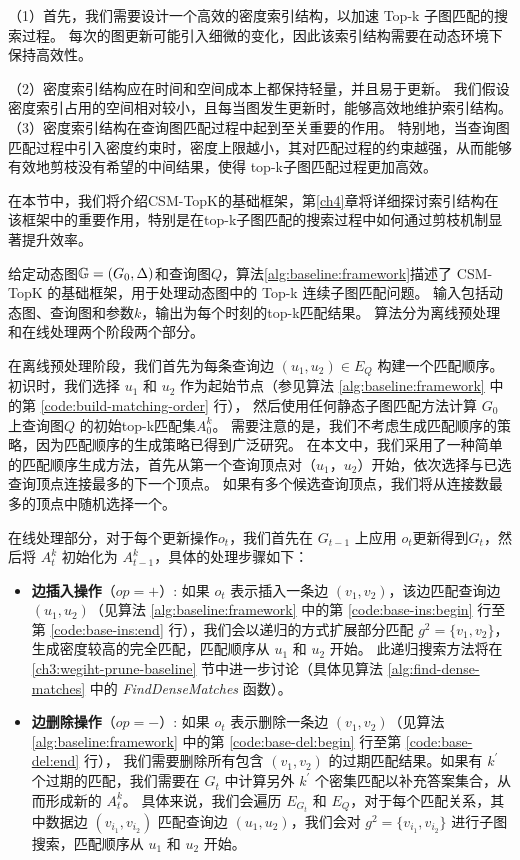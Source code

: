 （1）首先，我们需要设计一个高效的密度索引结构，以加速 Top-k 子图匹配的搜索过程。
每次的图更新可能引入细微的变化，因此该索引结构需要在动态环境下保持高效性。

（2）密度索引结构应在时间和空间成本上都保持轻量，并且易于更新。
我们假设密度索引占用的空间相对较小，且每当图发生更新时，能够高效地维护索引结构。
（3）密度索引结构在查询图匹配过程中起到至关重要的作用。
特别地，当查询图匹配过程中引入密度约束时，密度上限越小，其对匹配过程的约束越强，从而能够有效地剪枝没有希望的中间结果，使得 top-k子图匹配过程更加高效。

在本节中，我们将介绍CSM-TopK的基础框架，第\ref{ch4}章将详细探讨索引结构在该框架中的重要作用，特别是在top-k子图匹配的搜索过程中如何通过剪枝机制显著提升效率。

给定动态图$\mathbb{G}=(G_0, \Delta)$和查询图$Q$，算法\ref{alg:baseline:framework}描述了 CSM-TopK 的基础框架，用于处理动态图中的 Top-k 连续子图匹配问题。
输入包括动态图、查询图和参数$k$，输出为每个时刻的top-k匹配结果。
算法分为离线预处理和在线处理两个阶段两个部分。

在离线预处理阶段，我们首先为每条查询边 $(u_1, u_2) \in E_Q$ 构建一个匹配顺序。初识时，我们选择 $u_1$ 和 $u_2$ 作为起始节点（参见算法 \ref{alg:baseline:framework} 中的第 \ref{code:build-matching-order} 行），
然后使用任何静态子图匹配方法计算 $G_0$ 上查询图$Q$ 的初始top-k匹配集$A_0^k$。
需要注意的是，我们不考虑生成匹配顺序的策略，因为匹配顺序的生成策略已得到广泛研究。
在本文中，我们采用了一种简单的匹配顺序生成方法，首先从第一个查询顶点对（$u_1$，$u_2$）开始，依次选择与已选查询顶点连接最多的下一个顶点。
如果有多个候选查询顶点，我们将从连接数最多的顶点中随机选择一个。

在线处理部分，对于每个更新操作$o_t$，我们首先在 $G_{t-1}$ 上应用 $o_t$更新得到$G_t$，然后将 $A_t^k$ 初始化为 $A_{t-1}^k$，具体的处理步骤如下：
\begin{itemize}
    \item \textbf{边插入操作}（$op=+$）: 如果 $o_t$ 表示插入一条边 $(v_1, v_2)$，该边匹配查询边 $(u_1, u_2)$（见算法 \ref{alg:baseline:framework} 中的第 \ref{code:base-ins:begin} 行至第 \ref{code:base-ins:end} 行），我们会以递归的方式扩展部分匹配 $g^2 = \{v_1, v_2\}$，生成密度较高的完全匹配，匹配顺序从 $u_1$ 和 $u_2$ 开始。
    此递归搜索方法将在 \ref{ch3:wegiht-prune-baseline} 节中进一步讨论（具体见算法 \ref{alg:find-dense-matches} 中的 \emph{FindDenseMatches} 函数）。
    \item \textbf{边删除操作}（$op=-$）:  如果 $o_t$ 表示删除一条边 $(v_1, v_2)$（见算法 \ref{alg:baseline:framework} 中的第 \ref{code:base-del:begin} 行至第 \ref{code:base-del:end} 行），
    我们需要删除所有包含 $(v_1, v_2)$ 的过期匹配结果。如果有 $k^\prime$ 个过期的匹配，我们需要在 $G_t$ 中计算另外 $k^\prime$ 个密集匹配以补充答案集合，从而形成新的 $A_{t}^k$。
    具体来说，我们会遍历 $E_{G_t}$ 和 $E_Q$，对于每个匹配关系，其中数据边 $(v_{i_1}, v_{i_2})$ 匹配查询边 $(u_1, u_2)$，我们会对 $g^2 = \{v_{i_1}, v_{i_2}\}$ 进行子图搜索，匹配顺序从 $u_1$ 和 $u_2$ 开始。
\end{itemize}


